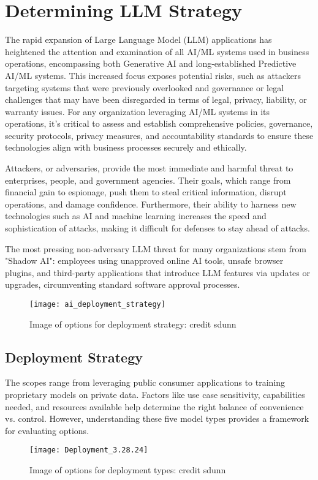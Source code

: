 

\headerimage
\chapter{Determining LLM Strategy}
The rapid expansion of Large Language Model (LLM) applications has heightened the attention and examination of all AI/ML systems used in business operations, encompassing both Generative AI and long-established Predictive AI/ML systems. This increased focus exposes potential risks, such as attackers targeting systems that were previously overlooked and governance or legal challenges that may have been disregarded in terms of legal, privacy, liability, or warranty issues. For any organization leveraging AI/ML systems in its operations, it's critical to assess and establish comprehensive policies, governance, security protocols, privacy measures, and accountability standards to ensure these technologies align with business processes securely and ethically.

Attackers, or adversaries, provide the most immediate and harmful threat to enterprises, people, and government agencies. Their goals, which range from financial gain to espionage, push them to steal critical information, disrupt operations, and damage confidence. Furthermore, their ability to harness new technologies such as AI and machine learning increases the speed and sophistication of attacks, making it difficult for defenses to stay ahead of attacks.

The most pressing non-adversary LLM threat for many organizations stem from "Shadow AI": employees using unapproved online AI tools, unsafe browser plugins, and third-party applications that introduce LLM features via updates or upgrades, circumventing standard software approval processes.

\begin{figure}[ht]
  \centering
  \texttt{[image: ai\_deployment\_strategy]}
  \caption{Image of options for deployment strategy: credit sdunn}
  \label{fig:llm-deployment-strategy}
\end{figure}

\clearpage

\section{Deployment Strategy}
The scopes range from leveraging public consumer applications to training proprietary models on private data. Factors like use case sensitivity, capabilities needed, and resources available help determine the right balance of convenience vs. control. However, understanding these five model types provides a framework for evaluating options.

\begin{figure}[ht]
  \centering
  \texttt{[image: Deployment\_3.28.24]}
  \caption{Image of options for deployment types: credit sdunn}
  \label{fig:llm-deployment-types}
\end{figure}
